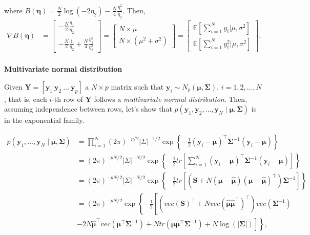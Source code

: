 \begin{enumerate}
where $B(\bm{\eta})=\frac{N}{2}\log(-2\eta_2)-\frac{N}{4}\frac{\eta_1^2}{\eta_2}$. Then,
\begin{align*}
	\nabla B(\bm{\eta}) & = \begin{bmatrix}
		-\frac{N}{2}\frac{\eta_1}{\eta_2}\\
		-\frac{N}{2}\frac{1}{\eta_2}+\frac{N}{4}\frac{\eta_1^2}{\eta_2^2}
	\end{bmatrix}
	=
	\begin{bmatrix}
		N\times\mu\\
		N\times(\mu^2+\sigma^2)
	\end{bmatrix}  = \begin{bmatrix}
		\mathbb{E}\left[\sum_{i=1}^N y_i\bigr\rvert \mu,\sigma^2\right]\\
		\mathbb{E}\left[\sum_{i=1}^N y_i^2\bigr\rvert \mu,\sigma^2\right]
	\end{bmatrix}. 
\end{align*}
\\

\textbf{Multivariate normal distribution}

Given $\bm{Y}=[\bm{y}_1 \ \bm{y}_2 \ \dots \ \bm{y}_p]$ a $N\times p$ matrix such that $\bm{y}_i\sim N_p(\bm{\mu},\bm{\Sigma})$, $i=1,2,\dots,N$, that is, each $i$-th row of $\bm{Y}$ follows a \textit{multivariate normal distribution}. Then, assuming independence between rows, let's show that $p(\bm{y}_1,\bm{y}_2,\dots,\bm{y}_N\mid \bm{\mu},\bm{\Sigma})$ is in the exponential family.

{\footnotesize{
\begin{align}
	p(\bm{y}_1,\dots,\bm{y}_N\mid \bm{\mu},\bm{\Sigma})&=\prod_{i=1}^N (2\pi)^{-p/2}| \Sigma|^{-1/2}\exp\left\{-\frac{1}{2}\left(\bm{y}_i-\bm{\mu}\right)^{\top}\bm{\Sigma}^{-1}\left(\bm{y}_i-\bm{\mu}\right)\right\}\nonumber\\
	&= (2\pi)^{-pN/2}|\Sigma|^{-N/2}\exp\left\{-\frac{1}{2}tr\left[\sum_{i=1}^N\left(\bm{y}_i-\bm{\mu}\right)^{\top}\bm{\Sigma}^{-1}\left(\bm{y}_i-\bm{\mu}\right)\right]\right\}\nonumber\\
	&= (2\pi)^{-p N/2}|\Sigma|^{-N/2}\exp\left\{-\frac{1}{2}tr\left[\left(\bm{S}+N\left(\bm{\mu}-\hat{\bm{\mu}}\right)\left(\bm{\mu}-\hat{\bm{\mu}}\right)^{\top}\right)\bm{\Sigma}^{-1}\right]\right\}\nonumber\\
	&= (2\pi)^{-p N/2}\exp\left\{-\frac{1}{2}\left[\left(vec\left(\bm{S}\right)^{\top}+N vec\left(\hat{\bm{\mu}}\hat{\bm{\mu}}^{\top}\right)^{\top}\right)vec \left(\bm{\Sigma}^{-1}\right)\right.\right.\nonumber\\
	&\left.\left.-2N\hat{\bm{\mu}}^{\top}vec\left(\bm{\mu}^{\top}\bm{\Sigma}^{-1}\right)+N tr\left(\bm{\mu}\bm{\mu}^{\top}\bm{\Sigma}^{-1}\right)+N\log (|\bm{\Sigma}|)\right]\right\}\nonumber,
\end{align}
}}


\end{enumerate}
